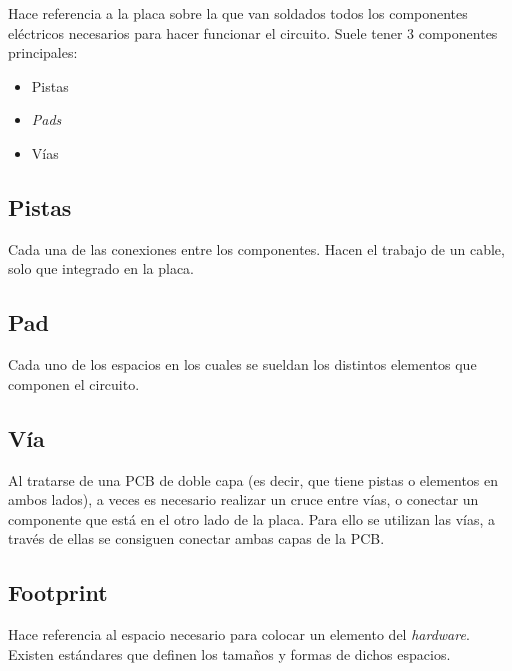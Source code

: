 Hace referencia a la placa sobre la que van soldados todos los componentes eléctricos necesarios para hacer funcionar el circuito. Suele tener 3 componentes principales:

\begin{itemize}
\item
Pistas
\item
\emph{Pads}
\item
Vías
\end{itemize}
\newpage
\subsection{Pistas}\label{pistas}

Cada una de las conexiones entre los componentes. Hacen el trabajo de un cable, solo que integrado en la placa.


\subsection{Pad}\label{pad}

Cada uno de los espacios en los cuales se sueldan los distintos  elementos que componen el circuito.


\subsection{Vía}\label{via}

Al tratarse de una PCB de doble capa (es decir, que tiene pistas o elementos en ambos lados), a veces es necesario realizar un cruce entre vías, o conectar un componente que está en el otro lado de la placa. Para ello se utilizan las vías, a través de ellas se consiguen conectar ambas capas de la PCB.


\subsection{Footprint}\label{footprint}

Hace referencia al espacio necesario para colocar un elemento del \emph{hardware}. Existen estándares que definen los tamaños y formas de dichos espacios.



